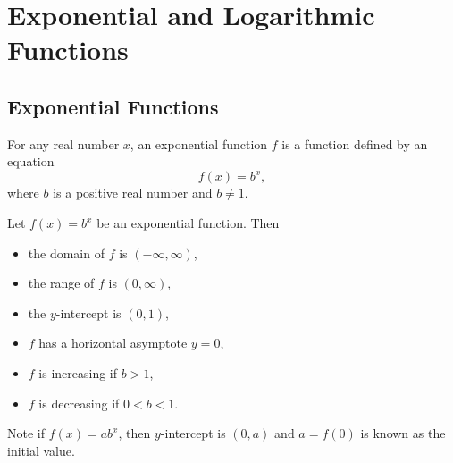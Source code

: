 
\chapter{Exponential and Logarithmic Functions}

\section{Exponential Functions}
\begin{definition}
For any real number $x$, an exponential function $f$ is a function defined by an equation
$$f(x)=b^x,$$
where $b$ is a positive real number and $b\ne 1$.
\end{definition}
\begin{multicols}{2}
  Let $f(x)=b^x$ be an exponential function. Then
  \begin{itemize}
    \item the domain of $f$ is $(-\infty, \infty)$,
    \item the range of $f$ is $(0, \infty)$,
    \item the $y$-intercept is $(0, 1)$,
    \item $f$ has a horizontal asymptote $y=0$,
    \item $f$ is increasing if $b>1$, 
    \item $f$ is decreasing if $0<b<1$.
  \end{itemize}
  

  Note if $f(x)=ab^x$, then $y$-intercept is $(0,a)$ and $a=f(0)$ is known as the initial value.

  \vfill\null
  \columnbreak

\end{multicols}

